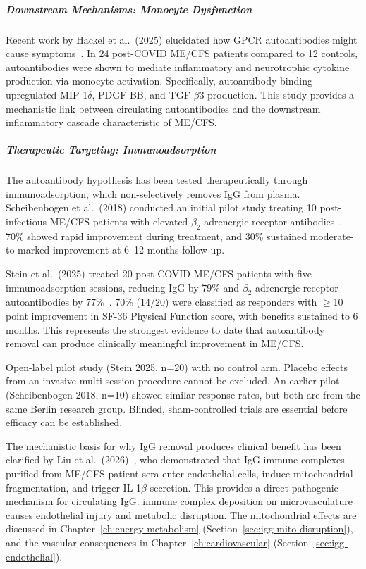 \subparagraph{Downstream Mechanisms: Monocyte Dysfunction}
Recent work by Hackel et al.\ (2025) elucidated how GPCR autoantibodies might cause symptoms~\cite{Hackel2025monocyte}. In 24 post-COVID ME/CFS patients compared to 12 controls, autoantibodies were shown to mediate inflammatory and neurotrophic cytokine production via monocyte activation. Specifically, autoantibody binding upregulated MIP-1$\delta$, PDGF-BB, and TGF-$\beta$3 production. This study provides a mechanistic link between circulating autoantibodies and the downstream inflammatory cascade characteristic of ME/CFS.

\subparagraph{Therapeutic Targeting: Immunoadsorption}
The autoantibody hypothesis has been tested therapeutically through immunoadsorption, which non-selectively removes IgG from plasma. Scheibenbogen et al.\ (2018) conducted an initial pilot study treating 10 post-infectious ME/CFS patients with elevated $\beta_2$-adrenergic receptor antibodies~\cite{Scheibenbogen2018immunoadsorption}. 70\% showed rapid improvement during treatment, and 30\% sustained moderate-to-marked improvement at 6--12 months follow-up.

\begin{achievement}
\label{ach:immunoadsorption}
Stein et al.\ (2025) treated 20 post-COVID ME/CFS patients with five immunoadsorption sessions, reducing IgG by 79\% and $\beta_2$-adrenergic receptor autoantibodies by 77\%~\cite{Stein2024immunoadsorption}. 70\% (14/20) were classified as responders with $\geq$10 point improvement in SF-36 Physical Function score, with benefits sustained to 6 months. This represents the strongest evidence to date that autoantibody removal can produce clinically meaningful improvement in ME/CFS.
\end{achievement}

\begin{warning}
Open-label pilot study (Stein 2025, n=20) with no control arm. Placebo effects from an invasive multi-session procedure cannot be excluded. An earlier pilot (Scheibenbogen 2018, n=10) showed similar response rates, but both are from the same Berlin research group. Blinded, sham-controlled trials are essential before efficacy can be established.
\end{warning}

The mechanistic basis for why IgG removal produces clinical benefit has been clarified by Liu et al.\ (2026)~\cite{Liu2026IgGcomplexes}, who demonstrated that IgG immune complexes purified from ME/CFS patient sera enter endothelial cells, induce mitochondrial fragmentation, and trigger IL-1$\beta$ secretion. This provides a direct pathogenic mechanism for circulating IgG: immune complex deposition on microvasculature causes endothelial injury and metabolic disruption. The mitochondrial effects are discussed in Chapter~\ref{ch:energy-metabolism} (Section~\ref{sec:igg-mito-disruption}), and the vascular consequences in Chapter~\ref{ch:cardiovascular} (Section~\ref{sec:igg-endothelial}).

